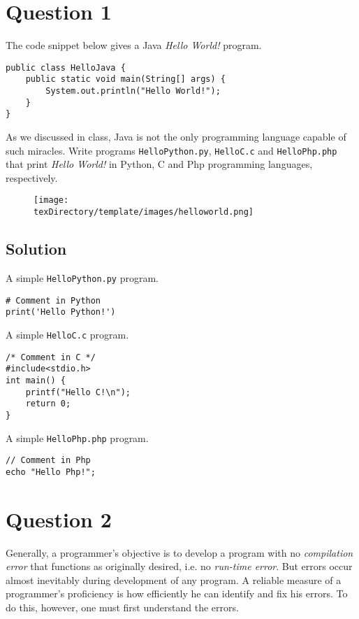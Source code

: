 \documentclass[12pt,letterpaper,twoside]{article}
\begin{document}


\section*{Question 1}

The code snippet below gives a Java \textit{Hello World!} program.
\lstset{language=Java}
\begin{lstlisting}
public class HelloJava {
	public static void main(String[] args) {
		System.out.println("Hello World!");
	}
}
\end{lstlisting}
As we discussed in class, Java is not the only programming language capable of such miracles. Write programs \texttt{HelloPython.py}, \texttt{HelloC.c} and \texttt{HelloPhp.php} that print \textit{Hello World!} in Python, C and Php programming languages, respectively.
\begin{figure}[H]\centering
\texttt{[image: \\texDirectory/template/images/helloworld.png]}
\end{figure}
\newpage

\subsection*{Solution}

A simple \texttt{HelloPython.py} program.
\lstset{language=Python}
\begin{lstlisting}
# Comment in Python
print('Hello Python!')
\end{lstlisting}
A simple \texttt{HelloC.c} program.
\lstset{language=C}
\begin{lstlisting}
/* Comment in C */
#include<stdio.h>
int main() {
    printf("Hello C!\n");
    return 0;
}
\end{lstlisting}
A simple \texttt{HelloPhp.php} program.
\lstset{language=php}
\begin{lstlisting}
// Comment in Php
echo "Hello Php!";
\end{lstlisting}

\section*{Question 2}

Generally, a programmer's objective is to develop a program with no \textit{compilation error} that functions as originally desired, i.e. no \textit{run-time error}.
But errors occur almost inevitably during development of any program.
A reliable measure of a programmer's proficiency is how efficiently he can identify and fix his errors.
To do this, however, one must first understand the errors.
\end{document}
